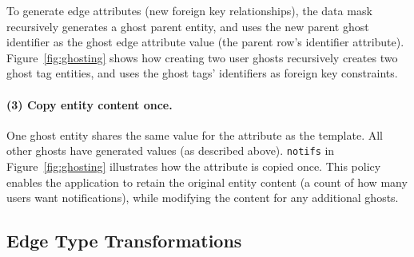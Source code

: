         To generate edge attributes (\eg new foreign key relationships), the data mask recursively
        generates a ghost parent entity, and uses the new parent
        ghost identifier as the ghost edge attribute value (\eg the parent row's identifier
        attribute). Figure~\ref{fig:ghosting}
        shows how creating two user ghosts recursively creates two ghost tag entities, and uses
        the ghost tags' identifiers as foreign key constraints.

\paragraph{(3) Copy entity content once.} One ghost entity shares the same value for the attribute as the
        template. All other ghosts have generated values (as described above).
        \texttt{notifs} in Figure~\ref{fig:ghosting} illustrates how the attribute is copied 
        once. This policy enables the application to retain the original entity content (\eg a count
        of how many users want notifications), while modifying the content for any additional
        ghosts.

\subsection{Edge Type Transformations}
\label{design:edgepol}

